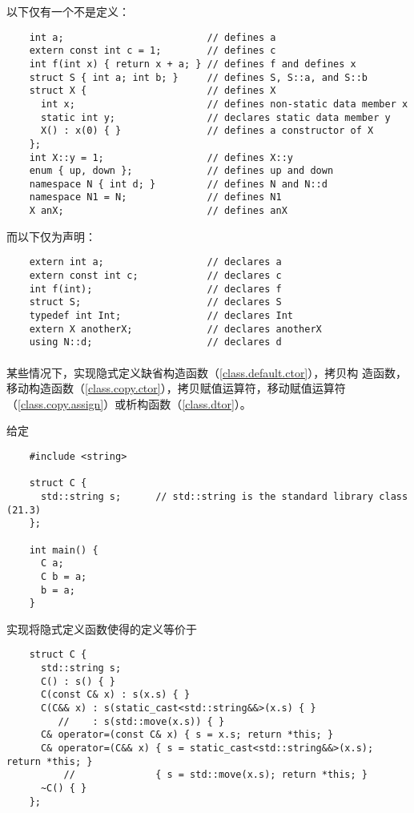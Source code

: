 \begin{example}
  以下仅有一个不是定义：
  \begin{lstlisting}
    int a;                         // defines a
    extern const int c = 1;        // defines c
    int f(int x) { return x + a; } // defines f and defines x
    struct S { int a; int b; }     // defines S, S::a, and S::b
    struct X {                     // defines X
      int x;                       // defines non-static data member x
      static int y;                // declares static data member y
      X() : x(0) { }               // defines a constructor of X
    };
    int X::y = 1;                  // defines X::y
    enum { up, down };             // defines up and down
    namespace N { int d; }         // defines N and N::d
    namespace N1 = N;              // defines N1
    X anX;                         // defines anX
  \end{lstlisting}
  而以下仅为声明：
  \begin{lstlisting}
    extern int a;                  // declares a
    extern const int c;            // declares c
    int f(int);                    // declares f
    struct S;                      // declares S
    typedef int Int;               // declares Int
    extern X anotherX;             // declares anotherX
    using N::d;                    // declares d
  \end{lstlisting}
\end{example}

\paragraph{} %
\begin{note}
  某些情况下，\cpp{}实现隐式定义缺省构造函数（\ref{class.default.ctor}），拷贝构
  造函数，移动构造函数（\ref{class.copy.ctor}），拷贝赋值运算符，移动赋值运算符
  （\ref{class.copy.assign}）或析构函数（\ref{class.dtor}）。
\end{note}

\begin{example}
  给定
  \begin{lstlisting}
    #include <string>

    struct C {
      std::string s;      // std::string is the standard library class (21.3)
    };

    int main() {
      C a;
      C b = a;
      b = a;
    }
  \end{lstlisting}
  实现将隐式定义函数使得的定义等价于
  \begin{lstlisting}
    struct C {
      std::string s;
      C() : s() { }
      C(const C& x) : s(x.s) { }
      C(C&& x) : s(static_cast<std::string&&>(x.s) { }
         //    : s(std::move(x.s)) { }
      C& operator=(const C& x) { s = x.s; return *this; }
      C& operator=(C&& x) { s = static_cast<std::string&&>(x.s); return *this; }
          //              { s = std::move(x.s); return *this; }
      ~C() { }
    };
  \end{lstlisting}
\end{example}

